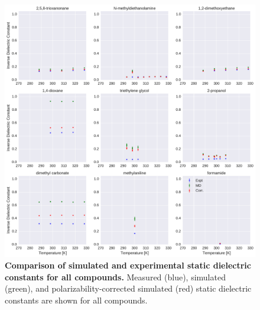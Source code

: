\documentclass[aip, jcp, reprint]{revtex4-1}  %
\begin{document}
\begin{figure}[alldielectric]

\ContinuedFloat

\includegraphics[width=\textwidth]{./figures/dielectric_versus_temperature_part3.pdf}

\caption{{\bf Comparison of simulated and experimental static dielectric constants for all compounds.}
Measured (blue), simulated (green), and polarizability-corrected simulated (red) static dielectric constants are shown for all compounds.
}

\label{figure:AllDielectrics}

\end{figure}
\end{document}
